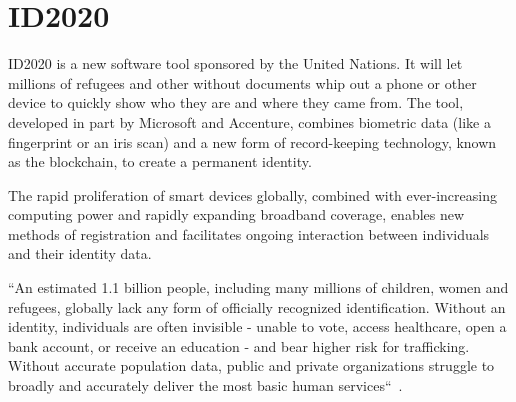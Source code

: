 \section{ID2020}

ID2020 is a new software tool sponsored 
by the United Nations. It will
let millions of refugees and other 
without documents whip out a phone
or other device to quickly show who
they are and where they came
from. The tool, developed in part 
by Microsoft and Accenture, combines
biometric data (like a fingerprint or 
an iris scan) and a new form of
record-keeping technology, known as 
the blockchain, to create a
permanent identity.
 
The rapid proliferation of smart 
devices globally, combined with
ever-increasing computing power 
and rapidly expanding broadband
coverage, enables new methods of 
registration and facilitates ongoing
interaction between individuals and 
their identity data.
 
``An estimated 1.1 billion people, 
including many millions of
children, women and refugees, globally 
lack any form of officially recognized 
identification. Without an 
identity, individuals are often
invisible - unable to vote, access 
healthcare, open a bank account, or
receive an education - and bear higher 
risk for trafficking. Without
accurate population data, public and 
private organizations struggle to
broadly and accurately deliver the 
most basic human 
services``~\cite{hid-sp18-506-NoID}.